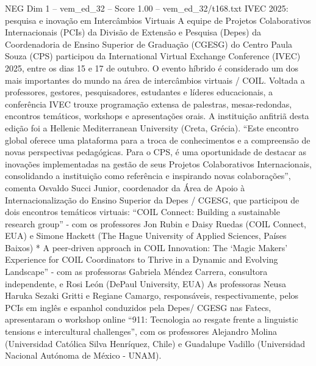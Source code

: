 \begin{textsample}{NEG Dim 1 – vem\_ed\_32 – Score 1.00 – vem\_ed\_32/t168.txt}  \label{ex:f1_neg_033}
IVEC 2025: pesquisa e inovação em Intercâmbios Virtuais A equipe de Projetos Colaborativos Internacionais (PCIs) da Divisão de Extensão e Pesquisa (Depes) da Coordenadoria de Ensino Superior de Graduação (CGESG) do Centro Paula Souza (CPS) participou da International Virtual Exchange Conference (IVEC) 2025, entre os dias 15 e 17 de outubro.
O evento híbrido é considerado um dos mais importantes do mundo na área de intercâmbios virtuais / COIL.
Voltada a professores, gestores, pesquisadores, estudantes e líderes educacionais, a conferência IVEC trouxe programação extensa de palestras, mesas-redondas, encontros temáticos, workshops e apresentações orais.
A instituição anfitriã desta edição foi a Hellenic Mediterranean University (Creta, Grécia). “Este encontro global oferece uma plataforma para a troca de conhecimentos e a compreensão de novas perspectivas pedagógicas.
Para o CPS, é uma oportunidade de destacar as inovações implementadas na gestão de seus Projetos Colaborativos Internacionais, consolidando a instituição como referência e inspirando novas colaborações”, comenta Osvaldo Succi Junior, coordenador da Área de Apoio à Internacionalização do Ensino Superior da Depes / CGESG, que participou de dois encontros temáticos virtuais: “COIL Connect: Building a sustainable research group” - com os professores Jon Rubin e Daisy Ruedas (COIL Connect, EUA) e Simone Hackett (The Hague University of Applied Sciences, Países Baixos) * A peer-driven approach in COIL Innovation: The ‘Magic Makers’ Experience for COIL Coordinators to Thrive in a Dynamic and Evolving Landscape” - com as professoras Gabriela Méndez Carrera, consultora independente, e Rosi León (DePaul University, EUA) As professoras Neusa Haruka Sezaki Gritti e Regiane Camargo, responsáveis, respectivamente, pelos PCIs em inglês e espanhol conduzidos pela Depes/ CGESG nas Fatecs, apresentaram o workshop online “911: Tecnologia ao resgate frente a linguistic tensions e intercultural challenges”, com os professores Alejandro Molina (Universidad Católica Silva Henríquez, Chile) e Guadalupe Vadillo (Universidad Nacional Autónoma de México - UNAM).

\end{textsample}
